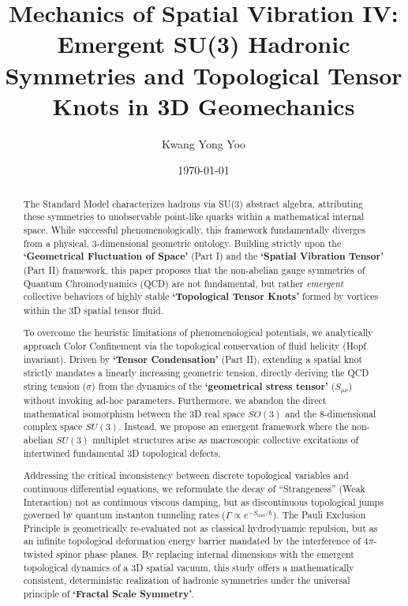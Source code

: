 \documentclass[reprint,amsmath,amssymb,aps,prd]{revtex4-2}
\begin{document}

\title{Mechanics of Spatial Vibration IV: Emergent SU(3) Hadronic Symmetries and Topological Tensor Knots in 3D Geomechanics}

\author{Kwang Yong Yoo}

\date{\today}

\begin{abstract}
The Standard Model characterizes hadrons via SU(3) abstract algebra, attributing these symmetries to unobservable point-like quarks within a mathematical internal space. While successful phenomenologically, this framework fundamentally diverges from a physical, 3-dimensional geometric ontology. Building strictly upon the \textbf{`Geometrical Fluctuation of Space'} (Part I) and the \textbf{`Spatial Vibration Tensor'} (Part II) framework, this paper proposes that the non-abelian gauge symmetries of Quantum Chromodynamics (QCD) are not fundamental, but rather \textit{emergent} collective behaviors of highly stable \textbf{`Topological Tensor Knots'} formed by vortices within the 3D spatial tensor fluid.

To overcome the heuristic limitations of phenomenological potentials, we analytically approach Color Confinement via the topological conservation of fluid helicity (Hopf invariant). Driven by \textbf{`Tensor Condensation'} (Part II), extending a spatial knot strictly mandates a linearly increasing geometric tension, directly deriving the QCD string tension ($\sigma$) from the dynamics of the \textbf{`geometrical stress tensor'} ($S_{\mu\nu}$) without invoking ad-hoc parameters. Furthermore, we abandon the direct mathematical isomorphism between the 3D real space $SO(3)$ and the 8-dimensional complex space $SU(3)$. Instead, we propose an emergent framework where the non-abelian $SU(3)$ multiplet structures arise as macroscopic collective excitations of intertwined fundamental 3D topological defects.

Addressing the critical inconsistency between discrete topological variables and continuous differential equations, we reformulate the decay of ``Strangeness'' (Weak Interaction) not as continuous viscous damping, but as discontinuous topological jumps governed by quantum instanton tunneling rates ($\Gamma \propto e^{-S_{\mathrm{inst}}/\hbar}$). The Pauli Exclusion Principle is geometrically re-evaluated not as classical hydrodynamic repulsion, but as an infinite topological deformation energy barrier mandated by the interference of $4\pi$-twisted spinor phase planes. By replacing internal dimensions with the emergent topological dynamics of a 3D spatial vacuum, this study offers a mathematically consistent, deterministic realization of hadronic symmetries under the universal principle of \textbf{`Fractal Scale Symmetry'}.
\end{abstract}
\end{document}
